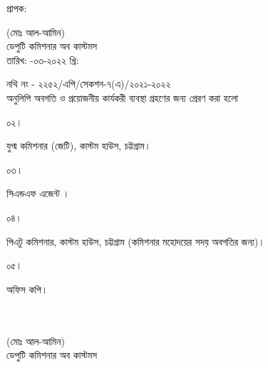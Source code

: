\documentclass[12pt]{article}
\newcommand{\fileno}{নথি নং - ২২৫২/এপি/সেকশন-৭(এ)/২০২১-২০২২}
\newcommand{\impn}{\jeal}
\newcommand{\impadd}{\jeala}
\newcommand{\rodt}{\hspace{3em}-০৩-২০২২ খ্রি:}
\begin{document}
\begin{minipage}[t]{0.05\linewidth}
প্রাপক:
\end{minipage}
\begin{minipage}[t]{0.65\linewidth}
{\impn}
\end{minipage}
\begin{minipage}[t]{0.30\linewidth}
\hspace{0em}
\end{minipage}
\begin{minipage}[t]{0.05\linewidth}
\hspace{0em}
\end{minipage}
\begin{minipage}[t]{0.65\linewidth}
{\impadd}
\end{minipage}
\begin{minipage}[t]{0.30\linewidth}
\begin{center}
(মোঃ আল-আমিন)
\\
ডেপুটি কমিশনার অব কাস্টমস
\\
তারিখ: {\rodt}
\end{center}
\end{minipage}
\newline
{\fileno}
\\
অনুলিপি অবগতি ও প্রয়োজনীয় কার্যকরী ব্যবস্থা গ্রহণের জন্য প্রেরণ করা হলো
\\
\begin{minipage}[t]{0.06\linewidth}
০২।
\end{minipage}
\begin{minipage}[t]{0.94\linewidth}
যুগ্ম কমিশনার (জেটি), কাস্টম হাউস, চট্টগ্রাম।
\end{minipage}
\begin{minipage}[t]{0.06\linewidth}
০৩।
\end{minipage}
\begin{minipage}[t]{0.94\linewidth}
সিএন্ডএফ এজেন্ট {\cnfn}।
\end{minipage}
\begin{minipage}[t]{0.06\linewidth}
০৪।
\end{minipage}
\begin{minipage}[t]{0.94\linewidth}
পিএটু কমিশনার, কাস্টম হাউস, চট্টগ্রাম (কমিশনার মহোদয়ের সদয় অবগতির জন্য)।
\end{minipage}
\begin{minipage}[t]{0.06\linewidth}
০৫।
\end{minipage}
\begin{minipage}[t]{0.94\linewidth}
অফিস কপি।
\\
\\
\\
\end{minipage}
\begin{minipage}[t]{0.70\linewidth}
\hspace{0em}
\end{minipage}
\begin{minipage}[t]{0.30\linewidth}
\begin{center}
(মোঃ আল-আমিন)
\\
ডেপুটি কমিশনার অব কাস্টমস
\end{center}
\end{minipage}
\thispagestyle{case}
\end{document}
